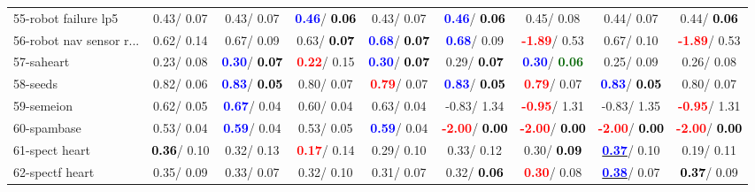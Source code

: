 \begin{table}[h]
\begin{center}
\begin{tabular}{lc|c|c|c|c|c|c|c}
55-robot failure lp5 &   0.43/  0.07 &   0.43/  0.07 & \textcolor{blue}{\textbf{  0.46}}/\textcolor{black}{\textbf{  0.06}} &   0.43/  0.07 & \textcolor{blue}{\textbf{  0.46}}/\textcolor{black}{\textbf{  0.06}} &   0.45/  0.08 &   0.44/  0.07 &   0.44/\textcolor{black}{\textbf{  0.06}} \\
56-robot nav sensor r... &   0.62/  0.14 &   0.67/  0.09 &   0.63/\textcolor{black}{\textbf{  0.07}} & \textcolor{blue}{\textbf{  0.68}}/\textcolor{black}{\textbf{  0.07}} & \textcolor{blue}{\textbf{  0.68}}/  0.09 & \textcolor{red}{\textbf{ -1.89}}/  0.53 &   0.67/  0.10 & \textcolor{red}{\textbf{ -1.89}}/  0.53 \\
57-saheart &   0.23/  0.08 & \textcolor{blue}{\textbf{  0.30}}/\textcolor{black}{\textbf{  0.07}} & \textcolor{red}{\textbf{  0.22}}/  0.15 & \textcolor{blue}{\textbf{  0.30}}/\textcolor{black}{\textbf{  0.07}} &   0.29/\textcolor{black}{\textbf{  0.07}} & \textcolor{blue}{\textbf{  0.30}}/\textcolor{darkgreen}{\textbf{  0.06}} &   0.25/  0.09 &   0.26/  0.08 \\
58-seeds &   0.82/  0.06 & \textcolor{blue}{\textbf{  0.83}}/\textcolor{black}{\textbf{  0.05}} &   0.80/  0.07 & \textcolor{red}{\textbf{  0.79}}/  0.07 & \textcolor{blue}{\textbf{  0.83}}/\textcolor{black}{\textbf{  0.05}} & \textcolor{red}{\textbf{  0.79}}/  0.07 & \textcolor{blue}{\textbf{  0.83}}/\textcolor{black}{\textbf{  0.05}} &   0.80/  0.07 \\
59-semeion &   0.62/  0.05 & \textcolor{blue}{\textbf{  0.67}}/  0.04 &   0.60/  0.04 &   0.63/  0.04 &  -0.83/  1.34 & \textcolor{red}{\textbf{ -0.95}}/  1.31 &  -0.83/  1.35 & \textcolor{red}{\textbf{ -0.95}}/  1.31 \\
60-spambase &   0.53/  0.04 & \textcolor{blue}{\textbf{  0.59}}/  0.04 &   0.53/  0.05 & \textcolor{blue}{\textbf{  0.59}}/  0.04 & \textcolor{red}{\textbf{ -2.00}}/\textcolor{black}{\textbf{  0.00}} & \textcolor{red}{\textbf{ -2.00}}/\textcolor{black}{\textbf{  0.00}} & \textcolor{red}{\textbf{ -2.00}}/\textcolor{black}{\textbf{  0.00}} & \textcolor{red}{\textbf{ -2.00}}/\textcolor{black}{\textbf{  0.00}} \\ \hline
61-spect heart & \textcolor{black}{\textbf{  0.36}}/  0.10 &   0.32/  0.13 & \textcolor{red}{\textbf{  0.17}}/  0.14 &   0.29/  0.10 &   0.33/  0.12 &   0.30/\textcolor{black}{\textbf{  0.09}} & \underline{\textcolor{blue}{\textbf{  0.37}}}/  0.10 &   0.19/  0.11 \\
62-spectf heart &   0.35/  0.09 &   0.33/  0.07 &   0.32/  0.10 &   0.31/  0.07 &   0.32/\textcolor{black}{\textbf{  0.06}} & \textcolor{red}{\textbf{  0.30}}/  0.08 & \underline{\textcolor{blue}{\textbf{  0.38}}}/  0.07 & \textcolor{black}{\textbf{  0.37}}/  0.09 \\

\end{tabular}
\end{center}
\end{table}
